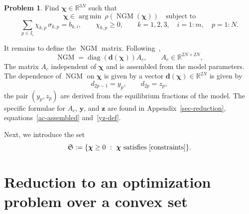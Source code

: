 \documentclass[11pt]{article}
\theoremstyle{plain}
\theoremstyle{definition}
\newtheorem{problem}[theorem]{Problem}
\theoremstyle{remark}
\numberwithin{equation}{section}
\numberwithin{figure}{section}
\numberwithin{table}{section}
\begin{document}
\begin{problem}\label{ngm-problem}
Find $\bm\chi\in\mathbb{R}^{3N}$ such that
\begin{equation}\label{the-min}
\bm\chi\in\operatorname*{arg\,min}\ \rho\left(\operatorname{NGM}(\bm\chi)\right)
\quad\mbox{subject to}
\end{equation}
\begin{equation}\label{constraints}
\sum_{p\in I_i}\chi_{k,p}\,\sigma_{k,p}=b_{k,i},\qquad \chi_{k,p}\ge 0,
\qquad k=1,2,3,\quad i=1:m,\quad p=1:N .
\end{equation}
\end{problem}

It remains to define the $\operatorname{NGM}$ matrix.
Following~\cite{JZh},
\begin{equation}\label{ngm}
\operatorname{NGM}=\operatorname{diag}\left(\bm d(\bm\chi)\right)A_c,
\qquad A_c\in\mathbb{R}^{2N\times 2N},
\end{equation}
The matrix $A_c$ independent of $\bm\chi$ and is assembled from the model parameters.
The dependence of $\operatorname{NGM}$ on $\bm\chi$ is given by a vector
$\bm d(\bm\chi)\in\mathbb{R}^{2N}$ is given by
\begin{equation}\label{yz}
d_{2p-1}=y_p,\qquad d_{2p}=z_p,
\end{equation}
the pair $(y_p,z_p)$ are derived from the equilibrium fractions of the model.
The specific formulae for $A_c$, $\bm y$, and $\bm z$ are found in
Appendix~\ref{sec-reduction}, equations~\eqref{ac-assembled} and~\eqref{yz-def}.

Next, we introduce the set 
\begin{equation}
    \mathfrak{S}:=\{\bm\chi\ge 0\ :\ \bm\chi\text{ satisfies~\eqref{constraints}}\}.
\end{equation}

\section{Reduction to an optimization problem over a convex set}\label{sec-reduced}
\end{document}

